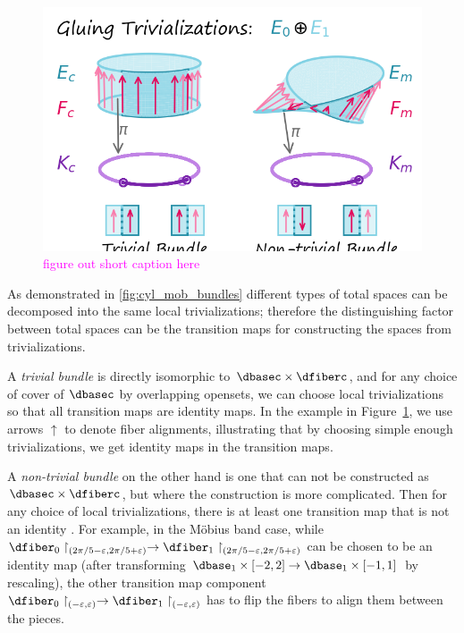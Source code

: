 \documentclass[journal]{IEEEtran}
\newcommand{\note}[1]{\textcolor{magenta}{#1}}
\theoremstyle{definition}
\theoremstyle{remark}
\begin{document}
\begin{figure}[H]
  \includegraphics[width=1\columnwidth]{figures/cyl_mob.png}
  \caption{\note{figure out short caption here}\label{fig:cyl_mob_bundles}}
\end{figure}
As demonstrated in \autoref{fig:cyl_mob_bundles} different types of total spaces can be decomposed into the same local trivializations; therefore the distinguishing factor between total spaces can be the transition maps for constructing the spaces from trivializations.

A \textit{trivial bundle} is directly isomorphic to $\dbasec\times\dfiberc$, and for any choice of cover of $\dbasec$ by overlapping opensets, we can choose local trivializations so that all transition maps are identity maps. In the example in Figure~\ref{fig:cyl_mob_bundles}, we use arrows $\uparrow$ to denote fiber alignments, illustrating that by choosing simple enough trivializations, we get identity maps in the transition maps.


A \textit{non-trivial bundle} on the other hand is one that can not be constructed as $\dbasec\times\dfiberc$, but where the construction is more complicated. Then for any choice of local trivializations, there is at least one transition map that is not an identity \cite{hatcherAlgebraicTopology2002}. For example, in the Möbius band case, while $\dfiber_0\restriction_{(2\pi/5-\varepsilon, 2\pi/5+\varepsilon)}\to\dfiber_1\restriction_{(2\pi/5-\varepsilon, 2\pi/5+\varepsilon)}$ can be chosen to be an identity map (after transforming $\dbase_1\times[-2,2]\to\dbase_1\times[-1,1]$ by rescaling), the other transition map component $\dfiber_0\restriction_{(-\varepsilon,\varepsilon)}\to\dfiber_1\restriction_{(-\varepsilon,\varepsilon)}$ has to flip the fibers to align them between the pieces.
\end{document}
